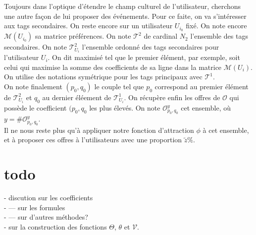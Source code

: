 \documentclass[11pt, oneside]{article}
\begin{document}
Toujours dans l'optique d'étendre le champ culturel de l'utilisateur, cherchons une autre façon de lui proposer des événements. Pour ce faite, on va s'intéresser aux tags secondaires. On reste encore sur un utilisateur $U_{i_0}$ fixé. On note encore $\mathcal{M} (U_{i_0})$ sa matrice préférences. On note $\mathcal{T}^2$ de cardinal $N_2$ l'ensemble des tags secondaires. On note $\mathcal{T}^2_{U_i}$ l'ensemble ordonné des tags secondaires pour l'utilisateur $U_i$. On dit maximisé tel que le premier élément, par exemple, soit celui qui maximise la somme des coefficients de sa ligne dans la matrice $\mathcal{M} (U_{i})$. On utilise des notations symétrique pour les tags principaux avec $\mathcal{T}^1$. \\
On note finalement $(p_0,q_0)$ le couple tel que $p_0$ correspond au premier élément de $\mathcal{T}^2_{U_i}$ et $q_0$ au dernier éléement de $\mathcal{T}^1_{U_i}$. On récupère enfin les offres de $\mathcal{O}$ qui possède le coefficient $(p_0,q_0$ les plus élevés. On note $\mathcal{O}_{p_0,q_0}^y$ cet ensemble, où $y = \# \mathcal{O}_{p_0,q_0}^y$. \\

Il ne nous reste plus qu'à appliquer notre fonction d'attraction $\phi$ à cet ensemble, et à proposer ces offres à l'utilisateurs avec une proportion $\tilde{z} \%$.

\section{todo}

- discution sur les coefficients \\
- --- sur les formules \\
- --- sur d'autres méthodes? \\
- sur la construction des fonctions $\Theta$, $\theta$ et $\mathcal{V}$. \\
\end{document}
